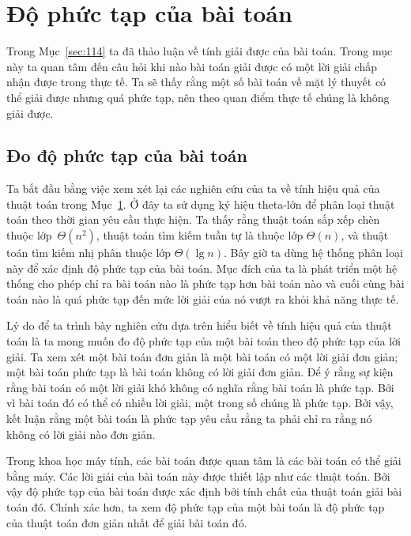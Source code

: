 \section{Độ phức tạp của bài toán}
Trong Mục~\ref{sec:114} ta đã thảo luận về tính giải được của bài toán. Trong mục này ta
quan tâm đến câu hỏi khi nào bài toán giải được có một lời giải chấp nhận được trong thực
tế. Ta sẽ thấy rằng một số bài toán về mặt lý thuyết có thể giải được nhưng quá phức tạp,
nên theo quan điểm thực tế chúng là không giải được.

\subsection*{Đo độ phức tạp của bài toán}

Ta bắt đầu bằng việc xem xét lại các nghiên cứu của ta về tính hiệu quả của thuật toán
trong Mục~\ref{}. Ở đây ta sử dụng ký hiệu theta-lớn để phân loại thuật toán theo thời
gian yêu cầu thực hiện. Ta thấy rằng thuật toán sắp xếp chèn thuộc lớp~$\Theta(n^2)$,
thuật toán tìm kiếm tuần tự là thuộc lớp $\Theta(n)$, và thuật toán tìm kiếm nhị phân
thuộc lớp $\Theta(\lg n)$. Bây giờ ta dùng hệ thống phân loại này để xác định độ phức tạp
của bài toán. Mục đích của ta là phát triển một hệ thống cho phép chỉ ra bài toán nào là
phức tạp hơn bài toán nào và cuối cùng bài toán nào là quá phức tạp đến mức lời giải của
nó vượt ra khỏi khả năng thực tế.

Lý do để ta trình bày nghiên cứu dựa trên hiểu biết về tính hiệu quả của thuật toán là ta
mong muốn đo độ phức tạp của một bài toán theo độ phức tạp của lời giải. Ta xem xét một
bài toán đơn giản là một bài toán có một lời giải đơn giản; một bài toán phức tạp là bài
toán không có lời giải đơn giản. Để ý rằng sự kiện rằng bài toán có một lời giải khó không
có nghĩa rằng bài toán là phức tạp. Bởi vì bài toán đó có thể có nhiều lời giải, một trong
số chúng là phức tạp. Bởi vậy, kết luận rằng một bài toán là phức tạp yêu cầu rằng ta phải
chỉ ra rằng nó không có lời giải nào đơn giản.

Trong khoa học máy tính, các bài toán được quan tâm là các bài toán có thể giải bằng
máy. Các lời giải của bài toán này được thiết lập như các thuật toán. Bởi vậy độ phức tạp
của bài toán được xác định bởi tính chất của thuật toán giải bài toán đó. Chính xác hơn,
ta xem độ phức tạp của một bài toán là độ phức tạp của thuật toán đơn giản nhất để giải bài
toán đó.

